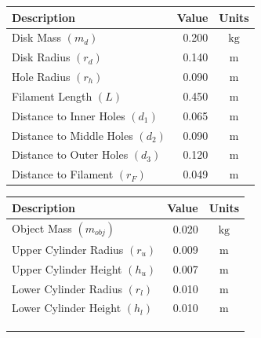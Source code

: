 \documentclass[a4paper]{article}
\begin{document}
\begin{figure}[h]
	\centering
	\begin{minipage}{0.45\textwidth}
		\centering
		\small
		\begin{tabular}{lrc}
			\toprule
			Description & Value & Units \\
			\midrule
			Disk Mass $(m_d)$ & 0.200 & $\si{\kilogram}$\\
			Disk Radius $(r_d)$ & 0.140 & $\si{\meter}$ \\
			Hole Radius $(r_h)$ & 0.090 & $\si{\meter}$ \\
			Filament Length $(L)$ & 0.450 & $\si{\meter}$ \\
			Distance to Inner Holes $(d_1)$ & 0.065 & $\si{\meter}$\\
			Distance to Middle Holes $(d_2)$ & 0.090 & $\si{\meter}$\\
			Distance to Outer Holes $(d_3)$ & 0.120 & $\si{\meter}$\\
			Distance to Filament $(r_F)$ & 0.049 & $\si{\meter}$ \\
			\bottomrule
		\end{tabular}
	\end{minipage}
	\hspace{1cm}
	\begin{minipage}{0.45\textwidth}
		\centering
		\small
		\begin{tabular}{lrc}
			\toprule
			Description & Value & Units \\
			\midrule
			Object Mass $(m_{obj})$ & 0.020 & $\si{\kilogram}$ \\
			Upper Cylinder Radius $(r_u)$ & 0.009 & $\si{\meter}$ \\
			Upper Cylinder Height $(h_u)$ & 0.007 & $\si{\meter}$ \\
			Lower Cylinder Radius $(r_l)$ & 0.010 & $\si{\meter}$ \\
			Lower Cylinder Height $(h_l)$ & 0.010 & $\si{\meter}$ \\
			 & & \\
			 & & \\
			 & & \\
			\bottomrule
		\end{tabular}
	\end{minipage}
\end{figure}
\end{document}

